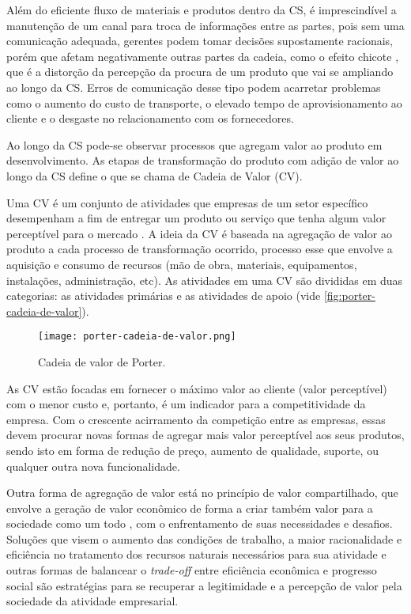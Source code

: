 Além do eficiente fluxo de materiais e produtos dentro da CS, é imprescindível a manutenção de um canal para troca de informações entre as partes, pois sem uma comunicação adequada, gerentes podem tomar decisões supostamente racionais, porém que afetam negativamente outras partes da cadeia, como o efeito chicote \cite{lee1997bullwhip}, que é a distorção da percepção da procura de um produto que vai se ampliando ao longo da CS. Erros de comunicação desse tipo podem acarretar problemas como o aumento do custo de transporte, o elevado tempo de aprovisionamento ao cliente e o desgaste no relacionamento com os fornecedores.

Ao longo da CS pode-se observar processos que agregam valor ao produto em desenvolvimento. As etapas de transformação do produto com adição de valor ao longo da CS define o que se chama de Cadeia de Valor (CV).

Uma CV é um conjunto de atividades que empresas de um setor específico desempenham a fim de entregar um produto ou serviço que tenha algum valor perceptível para o mercado \cite{porter1985competitiveadvantage}. A ideia da CV é baseada na agregação de valor ao produto a cada processo de transformação ocorrido, processo esse que envolve a aquisição e consumo de recursos (mão de obra, materiais, equipamentos, instalações, administração, etc). As atividades em uma CV são divididas em duas categorias: as atividades primárias e as atividades de apoio \cite{porter1985competitiveadvantage} (vide \autoref{fig:porter-cadeia-de-valor}).

\begin{figure}[htb]
	\centering
	\texttt{[image: porter-cadeia-de-valor.png]}
	\caption{Cadeia de valor de Porter.}
	\label{fig:porter-cadeia-de-valor}
\end{figure}

As CV estão focadas em fornecer o máximo valor ao cliente (valor perceptível) com o menor custo e, portanto, é um indicador para a competitividade da empresa. Com o crescente acirramento da competição entre as empresas, essas devem procurar novas formas de agregar mais valor perceptível aos seus produtos, sendo isto em forma de redução de preço, aumento de qualidade, suporte, ou qualquer outra nova funcionalidade.

Outra forma de agregação de valor está no princípio de valor compartilhado, que envolve a geração de valor econômico de forma a criar também valor para a sociedade como um todo \cite{porter2011valorcompartilhado}, com o enfrentamento de suas necessidades e desafios. Soluções que visem o aumento das condições de trabalho, a maior racionalidade e eficiência no tratamento dos recursos naturais necessários para sua atividade e outras formas de balancear o \textit{trade-off} entre eficiência econômica e progresso social são estratégias para se recuperar a legitimidade e a percepção de valor pela sociedade da atividade empresarial.

